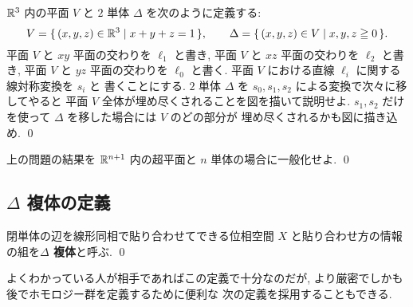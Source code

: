 \documentclass[12pt,twoside]{jarticle}
\begin{document}
\begin{question}
 ${\mathbb R}^3$ 内の平面 $V$ と $2$ 単体 $\Delta$ を次のように定義する:
 \begin{equation*}
  V = \{\,(x,y,z)\in{\mathbb R}^3\mid x+y+z=1\,\}, \qquad
  \Delta = \{\,(x,y,z)\in V\mid x,y,z\geqq 0\,\}.
 \end{equation*}
 平面 $V$ と $xy$ 平面の交わりを $\ell_1$ と書き, 
 平面 $V$ と $xz$ 平面の交わりを $\ell_2$ と書き, 
 平面 $V$ と $yz$ 平面の交わりを $\ell_0$ と書く.
 平面 $V$ における直線 $\ell_i$ に関する線対称変換を $s_i$ と
 書くことにする.
 $2$ 単体 $\Delta$ を $s_0,s_1,s_2$ による変換で次々に移してやると
 平面 $V$ 全体が埋め尽くされることを図を描いて説明せよ.
 $s_1,s_2$ だけを使って $\Delta$ を移した場合には $V$ のどの部分が
 埋め尽くされるかも図に描き込め.
 \qed
\end{question}

\begin{question}
 上の問題の結果を ${\mathbb R}^{n+1}$ 内の超平面と $n$ 単体の場合に一般化せよ. \qed
\end{question}


\subsection{$\Delta$ 複体の定義}
\label{sec:Delta-complex-def}

\begin{definition}
 閉単体の辺を線形同相で貼り合わせてできる位相空間 $X$ 
 と貼り合わせ方の情報の組を{\bf $\Delta$ 複体}と呼ぶ.
 \qed
\end{definition}

よくわかっている人が相手であればこの定義で十分なのだが,
より厳密でしかも後でホモロジー群を定義するために便利な
次の定義を採用することもできる.
\end{document}
